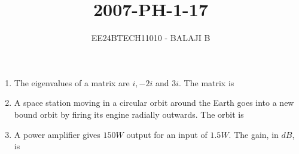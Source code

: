 \documentclass[journal]{IEEEtran}
\begin{document}

\vspace{3cm}

\title{2007-PH-1-17}
\author{EE24BTECH11010 - BALAJI B}
{\let\newpage\relax\maketitle}

\renewcommand{\thefigure}{\theenumi}
\renewcommand{\thetable}{\theenumi}
\setlength{\intextsep}{10pt} %
\renewcommand{\thetable}{\theenumi}
\begin{enumerate}
    \item The eigenvalues of a matrix are $i, -2i$ and $3i$. The matrix is 
    \begin{enumerate}
    \end{enumerate}
    \item A space station moving in a circular orbit around the Earth goes into a new bound orbit by firing its engine radially outwards. The orbit is 
    \begin{enumerate}
    \end{enumerate}
    \item A power amplifier gives $150W$ output for an input of $1.5W$. The gain, in $dB$, is 
    \begin{enumerate}
\end{enumerate}
\end{enumerate}
\end{document}
